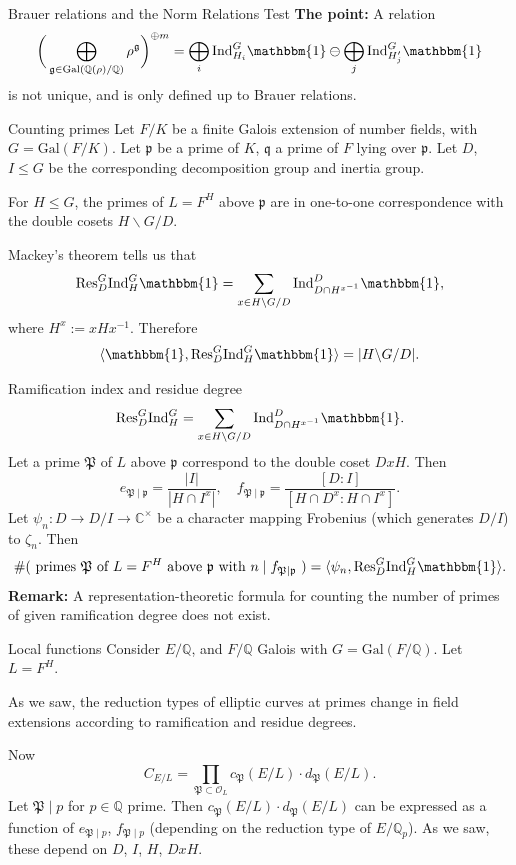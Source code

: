 \documentclass{beamer}
\newcommand{\Gal}{\mathrm{Gal}}
\newcommand{\trivial}{\mathbbm{1}}
\newcommand{\Ind}{\mathrm{Ind}}
\newcommand{\Res}{\mathrm{Res}}
\newcommand{\QQ}{\mathbb{Q}}
\newcommand{\bQ}{\mathbb{Q}}
\newcommand{\bC}{\mathbb{C}}
\newcommand{\fP}{\mathfrak{P}}
\newcommand{\fp}{\mathfrak{p}}
\newcommand{\fq}{\mathfrak{q}}
\newcommand{\cO}{\mathcal{O}}
\theoremstyle{plain}
\begin{document}
\begin{frame}{Brauer relations and the Norm Relations Test}
\textbf{The point:} A relation  
\[ \bigg(\bigoplus_{\mathfrak{g}\in\Gal(\QQ(\rho)/\QQ)}\rho^{\mathfrak{g}}\bigg)^{\oplus m}=\bigoplus_i\Ind_{H_i}^G\mathbbm{1}\ominus\bigoplus_j\Ind_{H'_j}^G\mathbbm{1}\]
is not unique, and is only defined up to Brauer relations.
\end{frame}

\begin{frame}{Counting primes}
    Let $F / K$ be a finite Galois extension of number fields, with $G = \Gal(F / K)$. \pause Let $\fp$ be a prime of $K$, $\fq$ a prime of $F$ lying over $\fp$. Let $D$, $I \leq G$ be the corresponding decomposition group and inertia group. \pause 
    
    \begin{lemma}    
    For $H \leq G$, the primes of $L = F^H$ above $\fp$ are in one-to-one correspondence with the double cosets $H  \backslash G / D$. 
    \end{lemma} \pause

    \vspace{1em}
    Mackey's theorem tells us that 
    \[ \Res_D^G \Ind_H^G  \trivial = \sum_{x \in H\backslash G / D} \Ind_{D \cap H^{x^{-1}}}^D \trivial, \]
    where $H^x := x H x^{-1}$. \pause Therefore
    \[ \langle \trivial, \Res_D^G \Ind_H^G \trivial \rangle = | H \backslash G / D|.\]
\end{frame}

\begin{frame}{Ramification index and residue degree}
    \[ \Res_D^G \Ind_H^G = \sum_{x \in H\backslash G / D} \Ind_{D \cap H^{x^{-1}}}^D \trivial. \]
    Let a prime $\fP$ of $L$ above $\fp$ correspond to the double coset $D x H$. \pause Then 
    \[ e_{\fP \mid \fp} = \frac{|I|}{|H \cap I^{x}|}, \quad  f_{\fP \mid \fp} = \frac{[D : I]}{[H \cap D^{x} : H \cap I^x]}.\] \pause 
    Let $\psi_n \colon D \to D / I \to \bC^{\times}$ be a character mapping Frobenius (which generates $D/ I$) to $\zeta_n$. Then 
    \[ \# (\text{ primes $\fP$ of $L = F^H$ above $\fp$ with $n \mid f_{\fP \mid \fp}$ }) = \langle \psi_n , \Res_D^G \Ind_H^G \trivial\rangle.  \] \pause 
    \textbf{Remark:}
        A representation-theoretic formula for counting the number of primes of given ramification degree does not exist. 
\end{frame}

\begin{frame}{Local functions}
    Consider $E / \bQ$, and $F / \bQ$ Galois with $G = \Gal(F / \bQ)$. Let $L = F^H$.
    
    As we saw, the reduction types of elliptic curves at primes change in field extensions according to ramification and residue degrees.\pause 

    Now $$C_{E / L} = \prod_{\fP \subset \cO_L} c_{\fP}(E / L) \cdot d_{\fP}(E / L).$$ 
    Let $\fP \mid p$ for $p \in \bQ$ prime. \pause Then $c_{\fP}(E / L) \cdot d_{\fP}(E / L)$ can be expressed as a function of $e_{\fP \mid p}$, $f_{\fP \mid p}$ (depending on the reduction type of $E / \bQ_p$). \pause As we saw, these depend on $D$, $I$, $H$, $DxH$. 
\end{frame}
\end{document}
